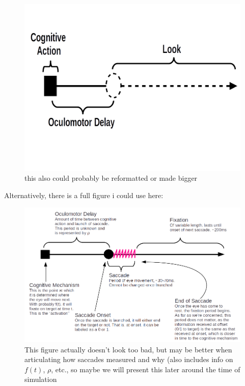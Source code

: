 \documentclass{article}
\begin{document}
\begin{figure}
\centering
\includegraphics[scale=0.25]{om_delay2.png}
\caption{this also could probably be reformatted or made bigger}
\label{fig:sac_fix_look_om}
\end{figure}

Alternatively, there is a full figure i could use here:


\begin{figure}
\centering
\includegraphics[scale=0.5]{labeled_full_diagram.png}
\caption{This figure actually doesn't look too bad, but may be better when articulating how saccades measured and why (also includes info on $f(t)$, $\rho$, etc., so maybe we will present this later around the time of simulation}
\label{fig:full_diagram_looks}
\end{figure}
\end{document}
